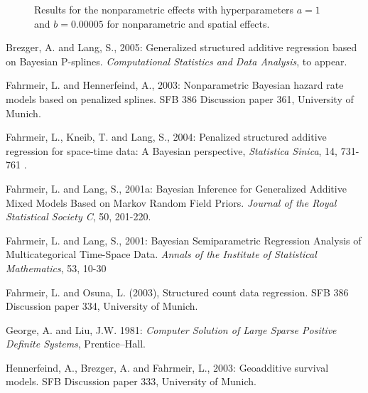 \documentclass{article}
\begin{document}
\begin{figure}[ht]
\begin{center}
 {\it\caption{Results for
the nonparametric effects with hyperparameters $a=1$ and $b=0.00005$
for nonparametric and spatial effects.\label{sensi3}}}
\end{center}
\end{figure}


\begin{thebibliography}{99}

 Brezger, A. and Lang,
S., 2005: Generalized structured additive regression based on
Bayesian P-splines. {\it Computational Statistics and Data
Analysis}, to appear.

 Fahrmeir,
L. and Hennerfeind, A., 2003: Nonparametric Bayesian hazard rate
models based on penalized splines. SFB 386 Discussion paper 361,
University of Munich.

 Fahrmeir, L., Kneib,
T. and Lang, S., 2004: Penalized structured additive regression for
space-time data: A Bayesian perspective, {\it Statistica Sinica},
14, 731-761 .

 Fahrmeir, L. and
Lang, S., 2001a: Bayesian Inference for Generalized Additive Mixed
Models Based on Markov Random Field Priors. {\it Journal of the
Royal Statistical Society C}, 50, 201-220.

 Fahrmeir, L. and
Lang, S., 2001: Bayesian Semiparametric Regression Analysis of
Multicategorical Time-Space Data. {\it Annals of the Institute of
Statistical Mathematics}, 53, 10-30

 Fahrmeir, L. and
Osuna, L. (2003), Structured count data regression. SFB 386
Discussion paper 334, University of Munich.

 George, A. and Liu,
J.W. 1981: {\it Computer Solution of Large Sparse Positive
Definite Systems}, Prentice--Hall.

 Hennerfeind, A.,
Brezger, A. and Fahrmeir, L., 2003: Geoadditive survival models.
SFB Discussion paper 333, University of Munich.


\end{thebibliography}
\end{document}

